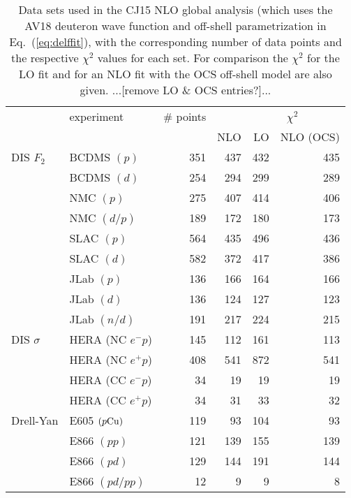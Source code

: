 \documentclass[aps,prd,amsmath,preprint]{revtex4}
\begin{document}
\newpage
\begin{table}[t]
\caption{Data sets used in the CJ15 NLO global analysis (which uses
	the AV18 deuteron wave function and off-shell parametrization
	in Eq.~(\ref{eq:delffit}), with the corresponding number of
	data points and the respective $\chi^2$ values for each set.
	For comparison the $\chi^2$ for the LO fit and for an NLO
	fit with the OCS off-shell model are also given.
	{\color{red} ...[remove LO \& OCS entries?]...} \\}
\centering
{\scriptsize  
\begin{tabular}[c]{llrrrr}  \hline
  & experiment  & \# points\!\!\!\! & \multicolumn{3}{c}{\ \ \ \ \ $\chi^2$} \\
  & 		& 		    & NLO  & LO  & NLO (OCS) \\ \hline
DIS $F_2$
  & BCDMS $(p)$ 	\cite{BCDMS}    & 351 & 437 & 432 & 435 \\
  & BCDMS $(d)$ 	\cite{BCDMS}    & 254 & 294 & 299 & 289 \\
  & NMC   $(p)$   	\cite{NMCp}     & 275 & 407 & 414 & 406 \\
  & NMC   $(d/p)$ 	\cite{NMCdop}   & 189 & 172 & 180 & 173 \\
  & SLAC  $(p)$  	\cite{SLAC}     & 564 & 435 & 496 & 436 \\
  & SLAC  $(d)$  	\cite{SLAC}     & 582 & 372 & 417 & 386 \\
  & JLab  $(p)$  	\cite{Malace}   & 136 & 166 & 164 & 166 \\
  & JLab  $(d)$  	\cite{Malace}   & 136 & 124 & 127 & 123 \\
  & JLab  $(n/d)$	\cite{BONuS}  	& 191 & 217 & 224 & 215 \\
DIS $\sigma$
  & HERA (NC $e^-p$) 	\cite{HERA1}    & 145 & 112 & 161 & 113 \\
  & HERA (NC $e^+p$) 	\cite{HERA1}    & 408 & 541 & 872 & 541 \\
  & HERA (CC $e^-p$) 	\cite{HERA1}    &  34 &  19 &  19 &  19 \\
  & HERA (CC $e^+p$) 	\cite{HERA1}    &  34 &  31 &  33 &  32 \\
Drell-Yan
  & E605 $(p{\rm Cu})$	\cite{E605}     & 119 &  93 & 104 &  93 \\ %
  & E866 $(pp)$		\cite{E866}     & 121 & 139 & 155 & 139 \\
  & E866 $(pd)$ 	\cite{E866}     & 129 & 144 & 191 & 144 \\
  & E866 $(pd/pp)$ 	\cite{E866rat}  &  12 &   9 &   9 &   8 \\

\end{tabular}}
\end{table}
\end{document}
